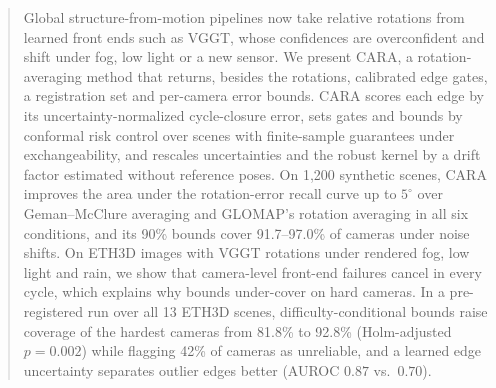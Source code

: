 \begin{abstract}
Global structure-from-motion pipelines now take relative rotations from learned front ends such as VGGT, whose confidences are overconfident and shift under fog, low light or a new sensor. We present CARA, a rotation-averaging method that returns, besides the rotations, calibrated edge gates, a registration set and per-camera error bounds. CARA scores each edge by its uncertainty-normalized cycle-closure error, sets gates and bounds by conformal risk control over scenes with finite-sample guarantees under exchangeability, and rescales uncertainties and the robust kernel by a drift factor estimated without reference poses. On 1,200 synthetic scenes, CARA improves the area under the rotation-error recall curve up to $5^\circ$ over Geman--McClure averaging and GLOMAP's rotation averaging in all six conditions, and its 90\% bounds cover 91.7--97.0\% of cameras under noise shifts. On ETH3D images with VGGT rotations under rendered fog, low light and rain, we show that camera-level front-end failures cancel in every cycle, which explains why bounds under-cover on hard cameras. In a pre-registered run over all 13 ETH3D scenes, difficulty-conditional bounds raise coverage of the hardest cameras from 81.8\% to 92.8\% (Holm-adjusted $p=0.002$) while flagging 42\% of cameras as unreliable, and a learned edge uncertainty separates outlier edges better (AUROC $0.87$ vs.\ $0.70$).
\end{abstract}
